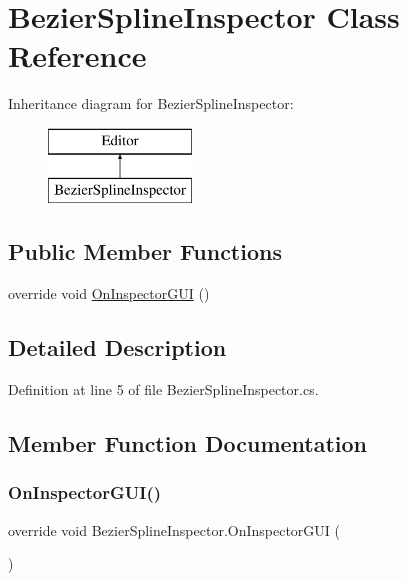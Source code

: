 \hypertarget{class_bezier_spline_inspector}{}\section{Bezier\+Spline\+Inspector Class Reference}
\label{class_bezier_spline_inspector}
Inheritance diagram for Bezier\+Spline\+Inspector\+:\begin{figure}[H]
\begin{center}
\leavevmode
\includegraphics[height=2.000000cm]{class_bezier_spline_inspector}
\end{center}
\end{figure}
\subsection*{Public Member Functions}
\begin{DoxyCompactItemize}
\item 
override void \mbox{\hyperlink{class_bezier_spline_inspector_a3232a5fd28ba98bf7b5d4aa170546f31}{On\+Inspector\+G\+UI}} ()
\end{DoxyCompactItemize}


\subsection{Detailed Description}


Definition at line 5 of file Bezier\+Spline\+Inspector.\+cs.



\subsection{Member Function Documentation}
\mbox{\label{class_bezier_spline_inspector_a3232a5fd28ba98bf7b5d4aa170546f31}} 
\subsubsection{\texorpdfstring{On\+Inspector\+G\+U\+I()}{OnInspectorGUI()}}
{\footnotesize\ttfamily override void Bezier\+Spline\+Inspector.\+On\+Inspector\+G\+UI (\begin{DoxyParamCaption}{ }\end{DoxyParamCaption})}



